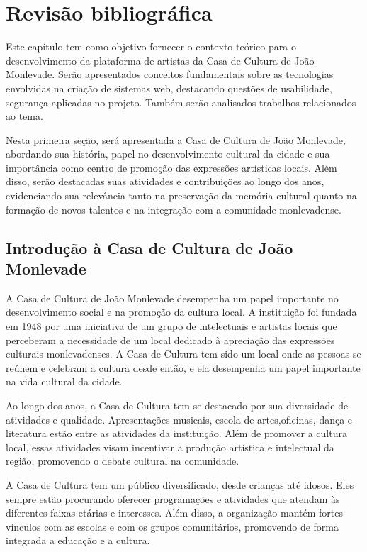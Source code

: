 \chapter{Revisão bibliográfica}
\label{cap:revisao}
Este capítulo tem como objetivo fornecer o contexto teórico para o desenvolvimento da plataforma de artistas da Casa de Cultura de João Monlevade. Serão apresentados conceitos fundamentais sobre as tecnologias envolvidas na criação de sistemas web, destacando questões de usabilidade, segurança aplicadas no projeto. Também serão analisados trabalhos relacionados ao tema.

Nesta primeira seção, será apresentada a Casa de Cultura de João Monlevade, abordando sua história, papel no desenvolvimento cultural da cidade e sua importância como centro de promoção das expressões artísticas locais. Além disso, serão destacadas suas atividades e contribuições ao longo dos anos, evidenciando sua relevância tanto na preservação da memória cultural quanto na formação de novos talentos e na integração com a comunidade monlevadense.


\section{Introdução à Casa de Cultura de João Monlevade}
A Casa de Cultura de João Monlevade desempenha um papel importante no desenvolvimento social e na promoção da cultura local. A instituição foi fundada em 1948 por uma iniciativa de um grupo de intelectuais e artistas locais que perceberam a necessidade de um local dedicado à apreciação das expressões culturais monlevadenses. A Casa de Cultura tem sido um local onde as pessoas se reúnem e celebram a cultura desde então, e ela desempenha um papel importante na vida cultural da cidade.

Ao longo dos anos, a Casa de Cultura tem se destacado por sua diversidade de atividades e qualidade. Apresentações musicais, escola de artes,oficinas, dança e literatura estão entre as atividades da instituição. Além de promover a cultura local, essas atividades visam incentivar a produção artística e intelectual da região, promovendo o debate cultural na comunidade.

A Casa de Cultura tem um público diversificado, desde crianças até idosos. Eles sempre estão procurando oferecer programações e atividades que atendam às diferentes faixas etárias e interesses. Além disso, a organização mantém fortes vínculos com as escolas e com os grupos comunitários, promovendo de forma integrada a educação e a cultura.

